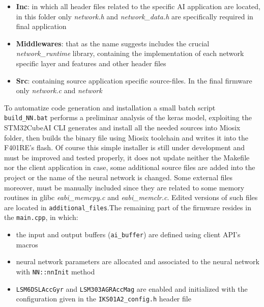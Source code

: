 \begin{itemize}
	\item \textbf{Inc}: in which all header files related to the specific AI application are located, in this folder only \textit{network.h} and \textit{network\_data.h} are specifically required in final application
	\item \textbf{Middlewares}: that as the name suggests includes the crucial \textit{network\_runtime} library, containing the implementation of each network specific layer and features and other header files
	\item \textbf{Src}: containing source application specific source-files. In the final firmware only \textit{network.c} and \textit{network}
\end{itemize} 
To automatize code generation and installation a small batch script \texttt{build_NN.bat} performs a preliminar analysis of the keras model, exploiting the STM32CubeAI CLI generates and install all the needed sources into Miosix folder, then builds the binary file using Miosix toolchain and writes it into the F401RE's flash. Of course this simple installer is still under development and must be improved and tested properly, it does not update neither the Makefile nor the client application in case, some additional source files are added into the project or the name of the neural network is changed. Some external files moreover, must be manually included since they are related to some memory routines in glibc \textit{eabi\_memcpy.c} and \textit{eabi\_memclr.c}. Edited versions of such files are located in \texttt{additional_files}.The remaining part of the firmware resides in the \texttt{main.cpp}, in which:
\begin{itemize}
	\item the input and output buffers (\texttt{ai_buffer}) are defined using client API's macros
	\item neural network parameters are allocated and associated to the neural network with \texttt{NN::nnInit} method
	\item \texttt{LSM6DSLAccGyr} and \texttt{LSM303AGRAccMag} are enabled and initialized with the configuration given in the \texttt{IKS01A2_config.h} header file
\end{itemize}  
